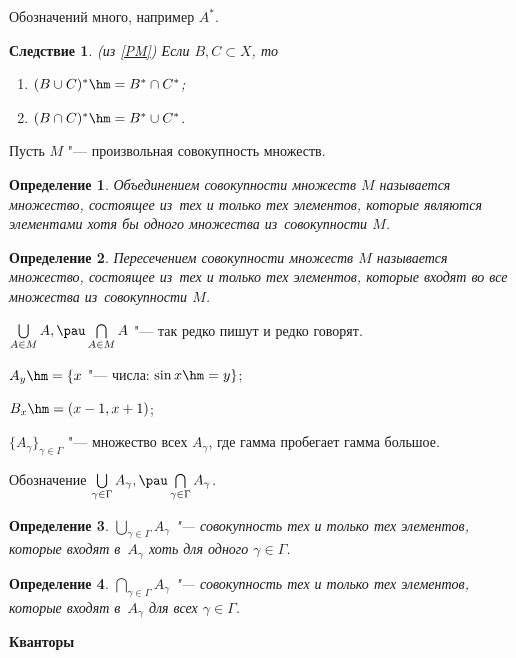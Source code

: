 \documentclass[a4paper,10pt,twoside]{article}
\newtheorem{Def}{Определение}[section]
\newtheorem{Sl}{Следствие}[section]
\begin{document}
    Обозначений много, например $A^*$.

    \begin{Sl}(из \ref{PM})
        Если $B,C\subset X$, то

        \begin{enumerate}
            \item $(B\cup C)^*\hm=B^*\cap C^*$;

            \item $(B\cap C)^*\hm=B^*\cup C^*$.
        \end{enumerate}
    \end{Sl}

Пусть $M$ "--- произвольная совокупность множеств.

\begin{Def}
    Объединением совокупности множеств $M$ называется множество, состоящее из~тех и только тех элементов,
     которые являются элементами хотя бы одного множества из~совокупности $M$.
\end{Def}

\begin{Def}
     Пересечением совокупности множеств $M$ называется множество, состоящее из~тех и только
      тех элементов, которые входят во все множества из~совокупности $M$.
\end{Def}

$\bigcup\limits_{A\in M} A,\pau \bigcap\limits_{A\in M} A$ "--- так редко пишут и редко говорят.

$A_y\hm=\{x$ "--- числа: $\sin x\hm=y\}$;

$B_x\hm=(x-1,x+1)$;

$\{A_\gamma\}_{\gamma\in \Gamma}$ "--- множество всех $A_{\gamma}$, где гамма пробегает гамма большое.

Обозначение $\bigcup\limits_{\gamma\in \Gamma} A_{\gamma},\pau
\bigcap\limits_{\gamma\in \Gamma} A_{\gamma}$.

\begin{Def}
$\bigcup\limits_{\gamma\in \Gamma} A_{\gamma}$ "--- совокупность тех и только тех элементов,
 которые входят в~$A_\gamma$ хоть для одного $\gamma\in\Gamma$.
\end{Def}


\begin{Def}
$\bigcap\limits_{\gamma\in \Gamma} A_{\gamma}$ "--- совокупность тех и только тех элементов,
 которые входят в~$A_\gamma$ для всех $\gamma\in\Gamma$.
\end{Def}

\textbf{Кванторы}
\end{document}

